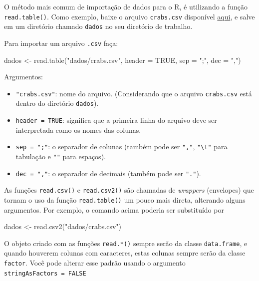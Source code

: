 \documentclass[
  10pt,
  a4paper]{book}
\newenvironment{Shaded}{\begin{snugshade}}{\end{snugshade}}
\newcommand{\AttributeTok}[1]{\textcolor[rgb]{0.77,0.63,0.00}{#1}}
\newcommand{\ConstantTok}[1]{\textcolor[rgb]{0.00,0.00,0.00}{#1}}
\newcommand{\FunctionTok}[1]{\textcolor[rgb]{0.00,0.00,0.00}{#1}}
\newcommand{\NormalTok}[1]{#1}
\newcommand{\OtherTok}[1]{\textcolor[rgb]{0.56,0.35,0.01}{#1}}
\newcommand{\StringTok}[1]{\textcolor[rgb]{0.31,0.60,0.02}{#1}}
\providecommand{\tightlist}{%
  \setlength{\itemsep}{0pt}\setlength{\parskip}{0pt}}
\begin{document}
O método mais comum de importação de dados para o R, é utilizando a
função \texttt{read.table()}. Como exemplo, baixe o arquivo \texttt{crabs.csv}
disponível \href{http://leg.ufpr.br/~fernandomayer/data/crabs.csv}{aqui}, e
salve em um diretório chamado \texttt{dados} no seu diretório de trabalho.

Para importar um arquivo \texttt{.csv} faça:

\begin{Shaded}
\begin{Highlighting}[]
\NormalTok{dados }\OtherTok{\textless{}{-}} \FunctionTok{read.table}\NormalTok{(}\StringTok{"dados/crabs.csv"}\NormalTok{, }\AttributeTok{header =} \ConstantTok{TRUE}\NormalTok{,}
                    \AttributeTok{sep =} \StringTok{";"}\NormalTok{, }\AttributeTok{dec =} \StringTok{","}\NormalTok{)}
\end{Highlighting}
\end{Shaded}

Argumentos:

\begin{itemize}
\tightlist
\item
  \texttt{"crabs.csv"}: nome do arquivo. (Considerando que o arquivo
  \texttt{crabs.csv} está dentro do diretório \texttt{dados}).
\item
  \texttt{header\ =\ TRUE}: significa que a primeira linha do arquivo deve ser
  interpretada como os nomes das colunas.
\item
  \texttt{sep\ =\ ";"}: o separador de colunas (também pode ser \texttt{","}, \texttt{"\textbackslash{}t"}
  para tabulação e \texttt{""} para espaços).
\item
  \texttt{dec\ =\ ","}: o separador de decimais (também pode ser \texttt{"."}).
\end{itemize}

As funções \texttt{read.csv()} e \texttt{read.csv2()} são chamadas de \emph{wrappers}
(envelopes) que tornam o uso da função \texttt{read.table()} um pouco mais
direta, alterando alguns argumentos. Por exemplo, o comando acima
poderia ser substituído por

\begin{Shaded}
\begin{Highlighting}[]
\NormalTok{dados }\OtherTok{\textless{}{-}} \FunctionTok{read.csv2}\NormalTok{(}\StringTok{"dados/crabs.csv"}\NormalTok{)}
\end{Highlighting}
\end{Shaded}

O objeto criado com as funções \texttt{read.*()} sempre serão da classe
\texttt{data.frame}, e quando houverem colunas com caracteres, estas colunas
sempre serão da classe \texttt{factor}. Você pode alterar esse padrão usando o
argumento \texttt{stringAsFactors\ =\ FALSE}
\end{document}
